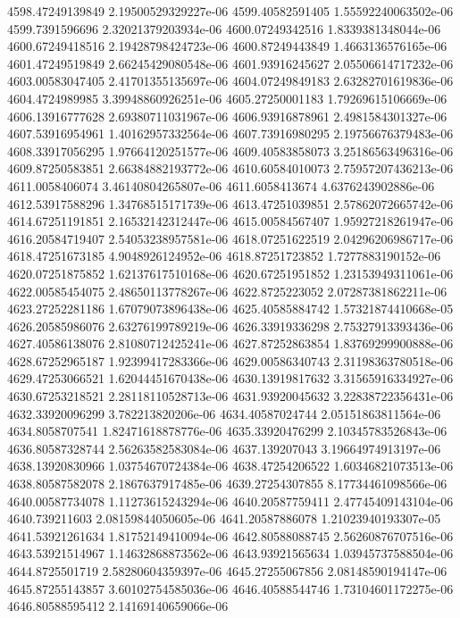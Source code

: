 {4598.47249139849 2.19500529329227e-06
4599.40582591405 1.55592240063502e-06
4599.7391596696 2.32021379203934e-06
4600.07249342516 1.8339381348044e-06
4600.67249418516 2.19428798424723e-06
4600.87249443849 1.4663136576165e-06
4601.47249519849 2.66245429080548e-06
4601.93916245627 2.05506614717232e-06
4603.00583047405 2.41701355135697e-06
4604.07249849183 2.63282701619836e-06
4604.4724989985 3.39948860926251e-06
4605.27250001183 1.79269615106669e-06
4606.13916777628 2.69380711031967e-06
4606.93916878961 2.4981584301327e-06
4607.53916954961 1.40162957332564e-06
4607.73916980295 2.19756676379483e-06
4608.33917056295 1.97664120251577e-06
4609.40583858073 3.25186563496316e-06
4609.87250583851 2.66384882193772e-06
4610.60584010073 2.75957207436213e-06
4611.0058406074 3.46140804265807e-06
4611.6058413674 4.6376243902886e-06
4612.53917588296 1.34768515171739e-06
4613.47251039851 2.57862072665742e-06
4614.67251191851 2.16532142312447e-06
4615.00584567407 1.95927218261947e-06
4616.20584719407 2.54053238957581e-06
4618.07251622519 2.04296206986717e-06
4618.47251673185 4.9048926124952e-06
4618.87251723852 1.7277883190152e-06
4620.07251875852 1.62137617510168e-06
4620.67251951852 1.23153949311061e-06
4622.00585454075 2.48650113778267e-06
4622.8725223052 2.07287381862211e-06
4623.27252281186 1.67079073896438e-06
4625.40585884742 1.57321874410668e-05
4626.20585986076 2.63276199789219e-06
4626.33919336298 2.75327913393436e-06
4627.40586138076 2.81080712425241e-06
4627.87252863854 1.83769299900888e-06
4628.67252965187 1.92399417283366e-06
4629.00586340743 2.31198363780518e-06
4629.47253066521 1.62044451670438e-06
4630.13919817632 3.31565916334927e-06
4630.67253218521 2.28118110528713e-06
4631.93920045632 3.22838722356431e-06
4632.33920096299 3.782213820206e-06
4634.40587024744 2.05151863811564e-06
4634.8058707541 1.82471618878776e-06
4635.33920476299 2.10345783526843e-06
4636.80587328744 2.56263582583084e-06
4637.139207043 3.19664974913197e-06
4638.13920830966 1.03754670724384e-06
4638.47254206522 1.60346821073513e-06
4638.80587582078 2.1867637917485e-06
4639.27254307855 8.17734461098566e-06
4640.00587734078 1.11273615243294e-06
4640.20587759411 2.47745409143104e-06
4640.739211603 2.08159844050605e-06
4641.20587886078 1.21023940193307e-05
4641.53921261634 1.81752149410094e-06
4642.80588088745 2.56260876707516e-06
4643.53921514967 1.14632868873562e-06
4643.93921565634 1.03945737588504e-06
4644.8725501719 2.58280604359397e-06
4645.27255067856 2.08148590194147e-06
4645.87255143857 3.60102754585036e-06
4646.40588544746 1.73104601172275e-06
4646.80588595412 2.14169140659066e-06
}
